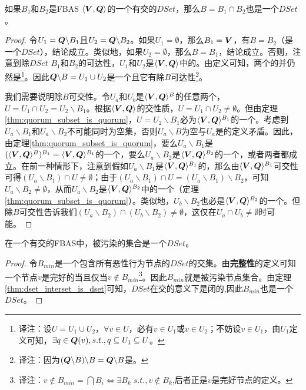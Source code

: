\begin{theorem}\label{thm:dset_interset_is_dset}
        如果$B_1$和$B_2$是FBAS $\langle{\bm V},{\bm Q}\rangle$的一个有{\quorum}交的$DSet$，那么$B=B_1\cap B_2$也是一个$DSet$。
\end{theorem}

\begin{proof}
        令$U_1={\bm Q}\backslash B_1$且$U_2={\bm Q}\backslash B_2$。如果$U_1=\emptyset$，那么$B_1={\bm V}$，有$B=B_2$（是一个$DSet$），结论成立。类似地，如果$U_2=\emptyset$，那么$B=B_1$，结论成立。否则，注意到除$DSet$ $B_1$和$B_2$的{\quorum}可达性，$U_1$和$U_2$是$\langle{\bm V},{\bm Q}\rangle$中的{\quorum}。由定义可知，两个{\quorum}的并仍然是{\quorum}{\footnote{译注：设$U=U_1\cup U_2$，$\forall v\in U$，必有$v\in U_1$或$v\in U_2$；不妨设$v\in U_1$，由$U_1$定义可知，$\exists q\in {\bm Q}(v), s.t., q\subseteq U_1\subseteq U$。}}。因此${{\bm Q}\backslash B}=U_1\cup U_2$是一个{\quorum}且它有除$B${\quorum}可达性{\footnote{译注：因为$({\bm Q}\backslash B)\backslash B={\bm Q}\backslash B$是{\quorum}。}}。
        
        我们需要说明除$B${\quorum}可交性。令$U_a$和$U_b$是$\langle{\bm V},{\bm Q}\rangle^{B}$的任意两个{\quorum}，$U=U_1\cap U_2 = U_2\backslash B_1$。根据$\langle{\bm V},{\bm Q}\rangle$的{\quorum}交性质，$U=U_1\cap U_2  \neq \emptyset$。但由定理\ref{thm:quorum_subset_is_quorum}，$U=U_2\backslash B_1$必为$\langle{\bm V},{\bm Q}\rangle^{B_1}$的一个{\quorum}。考虑到$U_a\backslash B_1$和$U_a\backslash B_2$不可能同时为空集，否则$U_a\backslash B$为空与$U_a$是{\quorum}的定义矛盾。因此，由定理\ref{thm:quorum_subset_is_quorum}，要么$U_a\backslash B_1$是$(\langle{\bm V},{\bm Q}\rangle^{B})^{B_1}=\langle{\bm V},{\bm Q}\rangle^{B_1}$的一个{\quorum}，要么$U_a\backslash B_2$是$\langle{\bm V},{\bm Q}\rangle^{B_2}$的一个{\quorum}，或者两者都成立。在前一种情形下，注意到假如$U_a\backslash B_1$是$\langle{\bm V},{\bm Q}\rangle^{B_1}$的{\quorum}，那么由$\langle{\bm V},{\bm Q}\rangle^{B_1}${\quorum}可交性可得$(U_a\backslash B_1)\cap U\neq \emptyset$；由于$(U_a\backslash B_1)\cap U = (U_a\backslash B_1)\backslash B_2$，可知$U_a\backslash B_2\neq \emptyset$，从而$U_a\backslash B_2$是$\langle{\bm V},{\bm Q}\rangle^{B_2}$中的一个{\quorum}（定理\ref{thm:quorum_subset_is_quorum}）。类似地，$U_b\backslash B_2$也必是$\langle{\bm V},{\bm Q}\rangle^{B_2}$的一个{\quorum}。但除$B${\quorum}可交性告诉我们$(U_a\backslash B_2)\cap (U_b\backslash B_2)\neq \emptyset$，这仅在$U_a\cap U_b\neq \emptyset$时可能。
\end{proof}

\begin{theorem}\label{thm:befouleds_are_dset}
        在一个有{\quorum}交的FBAS中，被污染的集合是一个$DSet$。
\end{theorem}

\begin{proof}
        令$B_{min}$是一个包含所有恶性行为节点的$DSet$的交集。由\textbf{完整性}的定义可知一个节点$v$是完好的当且仅当$v\not\in B_{min}${\footnote{译注：$v\not\in B_{min}=\bigcap B_{i}\iff \exists B_{k}\;s.t., v\not\in B_{k}$,后者正是$v$是完好节点的定义。}}。因此$B_{min}$就是被污染节点集合。由定理\ref{thm:dset_interset_is_dset}可知，$DSet$在交的意义下是闭的,因此$B_{min}$也是一个$DSet$。
\end{proof}
